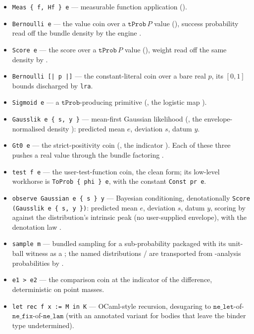 \begin{itemize}
  \item \texttt{Meas \{ f, Hf \} e} --- measurable function
    application ().
  \item \texttt{Bernoulli e} --- the value coin over a
    $\mathtt{tProb}\,P$ value (),
    success probability read off the bundle density
     by the engine
    .
  \item \texttt{Score e} --- the score over a $\mathtt{tProb}\,P$
    value (), weight read off the
    same density by .
  \item \texttt{Bernoulli [| p |]} --- the constant-literal coin over
    a bare real $p$, its $[0,1]$ bounds discharged by \texttt{lra}.
  \item \texttt{Sigmoid e} --- a $\mathtt{tProb}$-producing primitive
    (, the logistic map
    ).
  \item \texttt{Gausslik e \{ s, y \}} --- mean-first Gaussian
    likelihood (, the
    envelope-normalised density
    ): predicted mean $e$,
    deviation $s$, datum $y$.
  \item \texttt{Gt0 e} --- the strict-positivity coin
    (, the indicator
    ). Each of these three pushes a
    real value through the bundle factoring
    .
  \item \texttt{test f e} --- the user-test-function coin, the clean
    form; its low-level workhorse is \texttt{ToProb \{ phi \} e}, with
    the constant \texttt{Const pr e}.
  \item \texttt{observe Gaussian e \{ s \} y} --- Bayesian
    conditioning, denotationally \texttt{Score (Gausslik e \{ s, y
    \})}: predicted mean $e$, deviation $s$, datum $y$, scoring by
     against the
    distribution's intrinsic peak
     (no user-supplied
    envelope), with the denotation law
    .
  \item \texttt{sample m} --- bundled sampling for a sub-probability
    packaged with its unit-ball witness as a
    ; the named distributions
     /
     are transported from
    \mathcompA{}-analysis probabilities by
    .
  \item \texttt{e1 > e2} --- the comparison coin at the indicator
     of the difference,
    deterministic on point masses.
  \item \texttt{let rec f x := M in K} --- OCaml-style recursion,
    desugaring to
    $\mathtt{ne\_let}$-of-$\mathtt{ne\_fix}$-of-$\mathtt{ne\_lam}$
    (with an annotated variant for bodies that leave the binder type
    undetermined).
\end{itemize}
